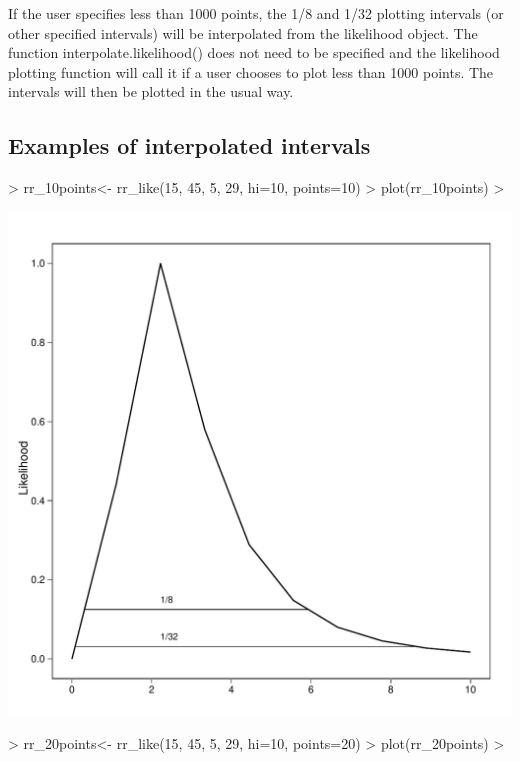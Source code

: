 \documentclass{article}
\begin{document}
If the user specifies less than 1000 points, the 1/8 and 1/32 plotting intervals (or other specified intervals) will
be interpolated from the likelihood object.  The function interpolate.likelihood() does not need to be specified and  the likelihood plotting function will call it if a user chooses to plot less than 1000 points.  The intervals will then be plotted in the usual way. 

\subsection{Examples of interpolated intervals}
\begin{Schunk}
\begin{Sinput}
> rr_10points<- rr_like(15, 45, 5, 29, hi=10, points=10)
> plot(rr_10points)
> 
\end{Sinput}
\end{Schunk}
\includegraphics{rr10points.pdf}\begin{Schunk}
\begin{Sinput}
> rr_20points<- rr_like(15, 45, 5, 29, hi=10, points=20)
> plot(rr_20points)
> 
\end{Sinput}
\end{Schunk}
\end{document}
